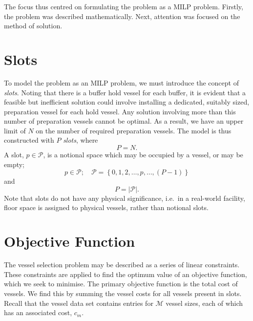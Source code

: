 The focus thus centred on formulating the problem as a MILP problem.
Firstly, the problem was described mathematically.
Next, attention was focused on the method of solution.

\section{Slots}\label{S.slots}

To model the problem as an MILP problem, we must introduce the concept of
\emph{slots}.
Noting that there is a buffer hold vessel for each buffer, it is evident that
a feasible but inefficient solution could involve installing a dedicated,
suitably sized, preparation vessel for each hold vessel.
Any solution involving more than this number of preparation vessels cannot
be optimal.
As a result, we have an upper limit of $N$ on the number of required
preparation vessels.
The model is thus constructed with $P$ \emph{slots}, where
\begin{equation}
    P = N.
\end{equation}
A slot, $p \in \mathcal{P}$, is a notional space which may be occupied by a
vessel, or may be empty;
\begin{equation}
    p \in \mathcal{P}; \quad \mathcal{P} = \left\{ 0, 1, 2, \ldots, p, \ldots,
    \left( P - 1 \right) \right\}
\end{equation}
and
\begin{equation}
    P = |\mathcal{P}|.
\end{equation}
Note that slots do not have any physical significance, i.e.\ in a real-world
facility, floor space is assigned to physical vessels, rather than notional
slots.

\section{Objective Function}\label{S.objfn}

The vessel selection problem may be described as a series of linear
constraints.
These constraints are applied to find the optimum value of an objective
function, which we seek to minimise.
The primary objective function is the total cost of vessels.
We find this by summing the vessel costs for all vessels present in slots.
Recall that the vessel data set contains entries for $\mathcal{M}$ vessel
sizes, each of which has an associated cost, $c_{m}$.

